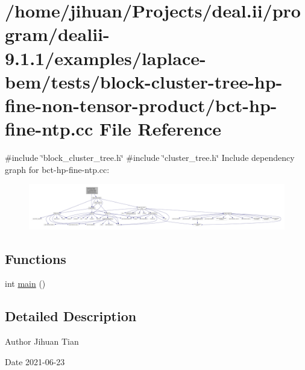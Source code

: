 \hypertarget{bct-hp-fine-ntp_8cc}{}\section{/home/jihuan/\+Projects/deal.ii/program/dealii-\/9.1.1/examples/laplace-\/bem/tests/block-\/cluster-\/tree-\/hp-\/fine-\/non-\/tensor-\/product/bct-\/hp-\/fine-\/ntp.cc File Reference}
\label{bct-hp-fine-ntp_8cc}
{\ttfamily \#include \char`\"{}block\+\_\+cluster\+\_\+tree.\+h\char`\"{}}\newline
{\ttfamily \#include \char`\"{}cluster\+\_\+tree.\+h\char`\"{}}\newline
Include dependency graph for bct-\/hp-\/fine-\/ntp.cc\+:
\nopagebreak
\begin{figure}[H]
\begin{center}
\leavevmode
\includegraphics[width=350pt]{bct-hp-fine-ntp_8cc__incl}
\end{center}
\end{figure}
\subsection*{Functions}
\begin{DoxyCompactItemize}
\item 
int \hyperlink{bct-hp-fine-ntp_8cc_ae66f6b31b5ad750f1fe042a706a4e3d4}{main} ()
\end{DoxyCompactItemize}


\subsection{Detailed Description}
\begin{DoxyAuthor}{Author}
Jihuan Tian 
\end{DoxyAuthor}
\begin{DoxyDate}{Date}
2021-\/06-\/23 
\end{DoxyDate}


